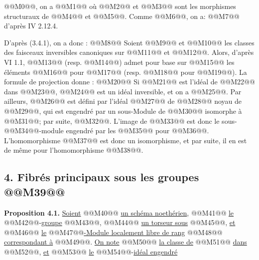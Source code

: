 
@@M0@@, on a
@@M1@@
où @@M2@@ et @@M3@@
sont les morphismes structuraux de @@M4@@ et @@M5@@. Comme @@M6@@, on a:
@@M7@@
d'après IV 2.12.4.

D'après (3.4.1), on a donc :
@@M8@@
Soient @@M9@@ et @@M10@@ les classes des faisceaux inversibles canoniques sur @@M11@@ et @@M12@@. Alors, d'après VI 1.1, @@M13@@ (resp. @@M14@@) admet pour base sur @@M15@@ les éléments @@M16@@ pour @@M17@@ (resp. @@M18@@ pour @@M19@@). La formule de projection donne :
@@M20@@
Si @@M21@@ est l'idéal de @@M22@@ dans @@M23@@, @@M24@@ est un idéal inversible, et on a @@M25@@. Par ailleurs, @@M26@@ est défini par l'idéal @@M27@@ de @@M28@@ noyau de @@M29@@, qui est engendré par un sous-Module de @@M30@@ isomorphe à @@M31@@; par suite, @@M32@@. L'image de @@M33@@ est donc le sous-@@M34@@-module engendré par les @@M35@@ pour @@M36@@. L'homomorphisme @@M37@@ est donc un isomorphisme, et par suite, il en est de même pour l'homomorphisme @@M38@@.

\subsection*{4. Fibrés principaux sous les groupes @@M39@@}

\textbf{Proposition 4.1.} \uline{Soient} @@M40@@ \uline{un schéma noethérien}, @@M41@@ \uline{le} @@M42@@-\uline{groupe} @@M43@@, @@M44@@ \uline{un torseur sous} @@M45@@, \uline{et} @@M46@@ \uline{le} @@M47@@\uline{-Module localement libre de rang} @@M48@@ \uline{correspondant à} @@M49@@. \uline{On note} @@M50@@ \uline{la classe de} @@M51@@ \uline{dans} @@M52@@, \uline{et} @@M53@@ \uline{le} @@M54@@-\uline{idéal engendré}
